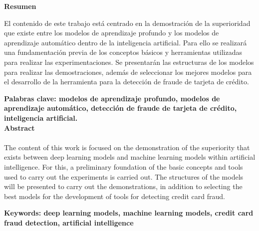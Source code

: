 \newpage
\textbf{\LARGE Resumen}

  El contenido de este trabajo est\'{a} centrado en la demostraci\'{o}n de la superioridad que existe entre los modelos de aprendizaje profundo y los modelos de aprendizaje autom\'{a}tico dentro de la inteligencia artificial. Para ello se realizar\'{a} una fundamentaci\'{o}n previa de los conceptos b\'{a}sicos y herramientas utilizadas para realizar las experimentaciones. Se presentar\'{a}n las estructuras de los modelos para realizar las demostraciones, adem\'{a}s de seleccionar los mejores modelos para el desarrollo de la herramienta para la detecci\'{o}n de fraude de tarjeta de cr\'{e}dito.
  
\textbf{\small Palabras clave: modelos de aprendizaje profundo, modelos de aprendizaje autom\'{a}tico, detecci\'{o}n de fraude de tarjeta de cr\'{e}dito, inteligencia artificial.}\\

\textbf{\LARGE Abstract}\\\\

The content of this work is focused on the demonstration of the superiority that exists between deep learning models and machine learning models within artificial intelligence. For this, a preliminary foundation of the basic concepts and tools used to carry out the experiments is carried out. The structures of the models will be presented to carry out the demonstrations, in addition to selecting the best models for the development of tools for detecting credit card fraud.

\textbf{\small Keywords: deep learning models, machine learning models, credit card fraud detection, artificial intelligence}\\